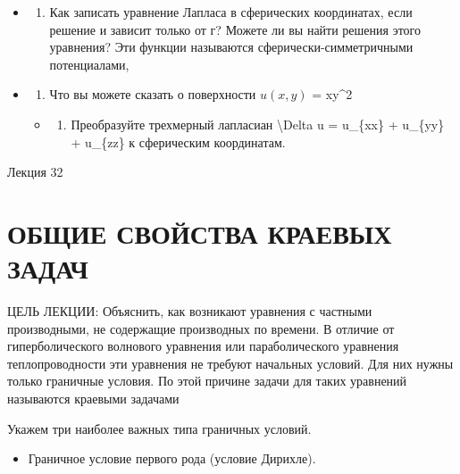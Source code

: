 \documentclass[
]{article}
\providecommand{\tightlist}{%
  \setlength{\itemsep}{0pt}\setlength{\parskip}{0pt}}
\begin{document}
{{{\begin{itemize}
\item
  \begin{enumerate}
  \def\labelenumi{\arabic{enumi}.}
  \setcounter{enumi}{3}
  \tightlist
  \item
    Как записать уравнение Лапласа в сферических координатах, если
    решение и зависит только от г? Можете ли вы найти решения этого
    уравнения? Эти функции называются сферически-симметричными
    потенциалами,
  \end{enumerate}
\item
  \begin{enumerate}
  \def\labelenumi{\arabic{enumi}.}
  \setcounter{enumi}{4}
  \tightlist
  \item
    Что вы можете сказать о поверхности \(u(x, y)\) = xy\^{}2
  \end{enumerate}

  \begin{itemize}
  \tightlist
  \item
    \begin{enumerate}
    \def\labelenumi{\arabic{enumi}.}
    \setcounter{enumi}{5}
    \tightlist
    \item
      Преобразуйте трехмерный лапласиан \textbackslash Delta u =
      u\_\{xx\} + u\_\{yy\} + u\_\{zz\} к сферическим координатам.
    \end{enumerate}
  \end{itemize}
\end{itemize}

Лекция 32

\section{ОБЩИЕ СВОЙСТВА КРАЕВЫХ
ЗАДАЧ}\label{ux43eux431ux449ux438ux435-ux441ux432ux43eux439ux441ux442ux432ux430-ux43aux440ux430ux435ux432ux44bux445-ux437ux430ux434ux430ux447}

ЦЕЛЬ ЛЕКЦИИ: Объяснить, как возникают уравнения с частными производными,
не содержащие производных по времени. В отличие от гиперболического
волнового уравнения или параболического уравнения теплопроводности эти
уравнения не требуют начальных условий. Для них нужны только граничные
условия. По этой причине задачи для таких уравнений называются краевыми
задачами

Укажем три наиболее важных типа граничных условий.

\begin{itemize}
\tightlist
\item
  Граничное условие первого рода (условие Дирихле).
\end{itemize}

}}}
\end{document}
